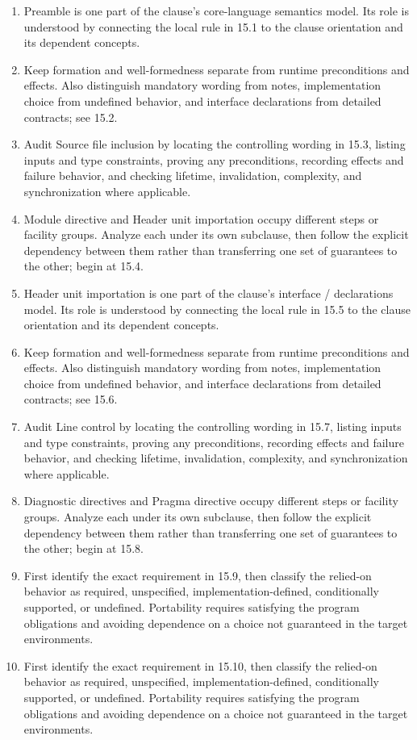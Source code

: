 \documentclass[11pt,letterpaper]{article}
\begin{document}
\begin{enumerate}
\item Preamble is one part of the clause's core-language semantics model. Its role is understood by connecting the local rule in 15.1 to the clause orientation and its dependent concepts.
\item Keep formation and well-formedness separate from runtime preconditions and effects. Also distinguish mandatory wording from notes, implementation choice from undefined behavior, and interface declarations from detailed contracts; see 15.2.
\item Audit Source file inclusion by locating the controlling wording in 15.3, listing inputs and type constraints, proving any preconditions, recording effects and failure behavior, and checking lifetime, invalidation, complexity, and synchronization where applicable.
\item Module directive and Header unit importation occupy different steps or facility groups. Analyze each under its own subclause, then follow the explicit dependency between them rather than transferring one set of guarantees to the other; begin at 15.4.
\item Header unit importation is one part of the clause's interface / declarations model. Its role is understood by connecting the local rule in 15.5 to the clause orientation and its dependent concepts.
\item Keep formation and well-formedness separate from runtime preconditions and effects. Also distinguish mandatory wording from notes, implementation choice from undefined behavior, and interface declarations from detailed contracts; see 15.6.
\item Audit Line control by locating the controlling wording in 15.7, listing inputs and type constraints, proving any preconditions, recording effects and failure behavior, and checking lifetime, invalidation, complexity, and synchronization where applicable.
\item Diagnostic directives and Pragma directive occupy different steps or facility groups. Analyze each under its own subclause, then follow the explicit dependency between them rather than transferring one set of guarantees to the other; begin at 15.8.
\item First identify the exact requirement in 15.9, then classify the relied-on behavior as required, unspecified, implementation-defined, conditionally supported, or undefined. Portability requires satisfying the program obligations and avoiding dependence on a choice not guaranteed in the target environments.
\item First identify the exact requirement in 15.10, then classify the relied-on behavior as required, unspecified, implementation-defined, conditionally supported, or undefined. Portability requires satisfying the program obligations and avoiding dependence on a choice not guaranteed in the target environments.
\end{enumerate}
\end{document}

